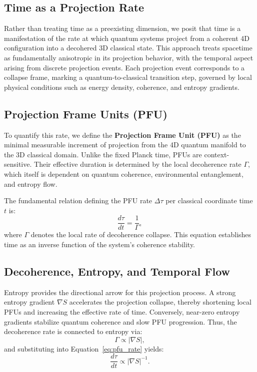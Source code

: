 \documentclass[12pt,a4paper]{article}
\numberwithin{equation}{section}
\begin{document}
\subsection{Time as a Projection Rate}

Rather than treating time as a preexisting dimension, we posit that time is a manifestation of the rate at which quantum systems project from a coherent 4D configuration into a decohered 3D classical state. This approach treats spacetime as fundamentally anisotropic in its projection behavior, with the temporal aspect arising from discrete projection events. Each projection event corresponds to a collapse frame, marking a quantum-to-classical transition step, governed by local physical conditions such as energy density, coherence, and entropy gradients.

\subsection{Projection Frame Units (PFU)}

To quantify this rate, we define the \textbf{Projection Frame Unit (PFU)} as the minimal measurable increment of projection from the 4D quantum manifold to the 3D classical domain. Unlike the fixed Planck time, PFUs are context-sensitive. Their effective duration is determined by the local decoherence rate $\Gamma$, which itself is dependent on quantum coherence, environmental entanglement, and entropy flow.

The fundamental relation defining the PFU rate $\Delta \tau$ per classical coordinate time $t$ is:
\begin{equation}
\label{eq:pfu_rate}
\frac{d\tau}{dt} = \frac{1}{\Gamma},
\end{equation}
where $\Gamma$ denotes the local rate of decoherence collapse. This equation establishes time as an inverse function of the system's coherence stability.

\subsection{Decoherence, Entropy, and Temporal Flow}

Entropy provides the directional arrow for this projection process. A strong entropy gradient $\nabla S$ accelerates the projection collapse, thereby shortening local PFUs and increasing the effective rate of time. Conversely, near-zero entropy gradients stabilize quantum coherence and slow PFU progression. Thus, the decoherence rate is connected to entropy via:
\begin{equation}
\label{eq:entropy_gradient}
\Gamma \propto |\nabla S|,
\end{equation}
and substituting into Equation~\eqref{eq:pfu_rate} yields:
\begin{equation}
\label{eq:pfu_entropy}
\frac{d\tau}{dt} \propto \left|\nabla S\right|^{-1}.
\end{equation}
\end{document}
